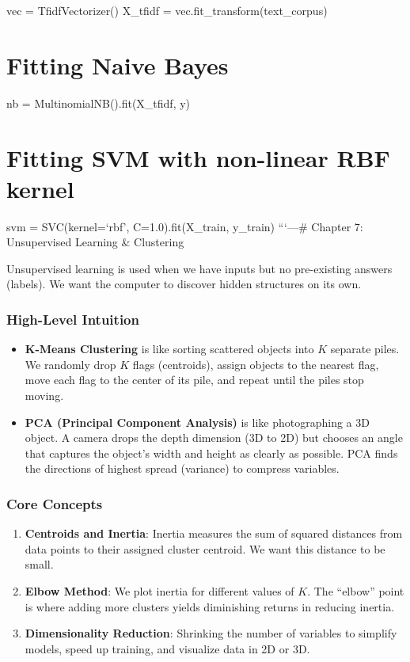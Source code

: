 vec = TfidfVectorizer() X\_tfidf = vec.fit\_transform(text\_corpus)

\section{Fitting Naive Bayes}\label{fitting-naive-bayes}

nb = MultinomialNB().fit(X\_tfidf, y)

\section{Fitting SVM with non-linear RBF
kernel}\label{fitting-svm-with-non-linear-rbf-kernel}

svm = SVC(kernel=`rbf', C=1.0).fit(X\_train, y\_train) ```\n\n---\n\n\#
Chapter 7: Unsupervised Learning \& Clustering

Unsupervised learning is used when we have inputs but no pre-existing
answers (labels). We want the computer to discover hidden structures on
its own.

\subsubsection{High-Level Intuition}\label{high-level-intuition-6}

\begin{itemize}
\tightlist
\item
  \textbf{K-Means Clustering} is like sorting scattered objects into
  \(K\) separate piles. We randomly drop \(K\) flags (centroids), assign
  objects to the nearest flag, move each flag to the center of its pile,
  and repeat until the piles stop moving.
\item
  \textbf{PCA (Principal Component Analysis)} is like photographing a 3D
  object. A camera drops the depth dimension (3D to 2D) but chooses an
  angle that captures the object's width and height as clearly as
  possible. PCA finds the directions of highest spread (variance) to
  compress variables.
\end{itemize}

\subsubsection{Core Concepts}\label{core-concepts-2}

\begin{enumerate}
\def\labelenumi{\arabic{enumi}.}
\tightlist
\item
  \textbf{Centroids and Inertia}: Inertia measures the sum of squared
  distances from data points to their assigned cluster centroid. We want
  this distance to be small.
\item
  \textbf{Elbow Method}: We plot inertia for different values of \(K\).
  The ``elbow'' point is where adding more clusters yields diminishing
  returns in reducing inertia.
\item
  \textbf{Dimensionality Reduction}: Shrinking the number of variables
  to simplify models, speed up training, and visualize data in 2D or 3D.
\end{enumerate}

